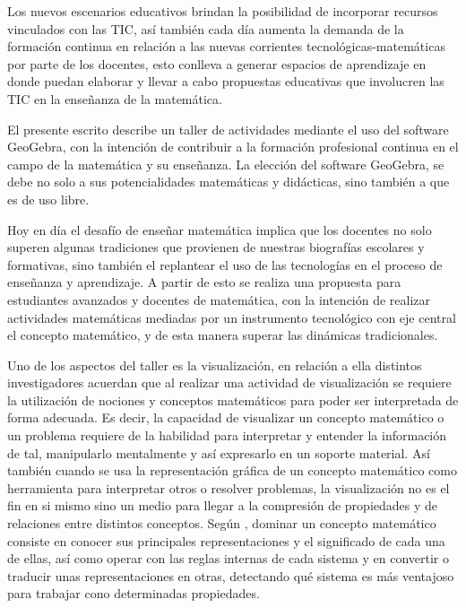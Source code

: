 Los nuevos escenarios educativos brindan la posibilidad de incorporar recursos vinculados con las TIC, así también cada día aumenta la
demanda de la formación continua en relación a las nuevas corrientes tecnológicas-matemáticas por parte de los docentes, esto conlleva
a generar espacios de aprendizaje en donde puedan elaborar y llevar a cabo propuestas educativas que involucren las TIC en la enseñanza de la matemática. 

El presente escrito describe un taller de actividades mediante el uso del software GeoGebra, con la intención de contribuir a la formación profesional continua en el campo de la matemática y su enseñanza. La elección del software GeoGebra, se debe no solo a sus potencialidades matemáticas y didácticas, sino también a que es de uso libre.

Hoy en día el desafío de enseñar matemática implica que los docentes no solo superen algunas tradiciones que provienen de nuestras biografías escolares y formativas, sino también el replantear el uso de las tecnologías en el proceso de enseñanza y aprendizaje. A partir de esto se realiza una propuesta para estudiantes avanzados y docentes de matemática, con la intención de realizar actividades matemáticas mediadas por un instrumento tecnológico con eje central el concepto matemático, y de esta manera superar las dinámicas tradicionales.

Uno de los aspectos del taller es la visualización, en relación a ella distintos investigadores \textcite{castro1997,cantoral2002} acuerdan que al realizar una actividad de visualización se requiere la utilización de nociones y conceptos matemáticos para poder ser interpretada de forma adecuada. Es decir, la capacidad de visualizar un concepto matemático o un problema requiere de la habilidad para interpretar y entender la información de tal, manipularlo mentalmente y así expresarlo en un soporte material. Así también cuando se usa la representación gráfica de un concepto matemático como herramienta para interpretar otros o resolver problemas, la visualización no es el fin en si mismo sino un medio para llegar a la compresión de propiedades y de relaciones entre distintos conceptos. Según \textcite[103]{castro1997}, dominar un concepto matemático consiste en conocer sus principales representaciones y el significado de cada una de ellas, así como operar con las reglas internas de cada sistema y en convertir o traducir unas representaciones en otras, detectando qué sistema es más ventajoso para trabajar cono determinadas propiedades. 

